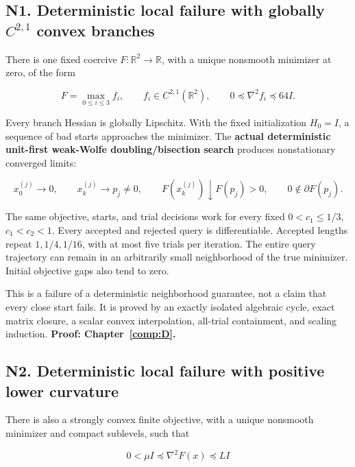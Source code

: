 

\subsection{N1. Deterministic local failure with globally \texorpdfstring{$C^{2,1}$}{C2,1} convex branches}\label{n1.-deterministic-local-failure-with-globally-c21-convex-branches}

There is one fixed coercive \(F:\mathbb R^2\to\mathbb R\), with a unique nonsmooth minimizer at zero, of the form

\[
 F=\max_{0\le i\le3}f_i,\qquad f_i\in C^{2,1}(\mathbb R^2),\qquad
 0\preceq\nabla^2f_i\preceq64I.
\]

Every branch Hessian is globally Lipschitz. With the fixed initialization \(H_0=I\), a sequence of bad starts approaches the minimizer. The \textbf{actual deterministic unit-first weak-Wolfe doubling/bisection search} produces nonstationary converged limits:

\[
 x_0^{(j)}\to0,\qquad x_k^{(j)}\to p_j\ne0,\qquad
 F(x_k^{(j)})\downarrow F(p_j)>0,\qquad0\notin\partial F(p_j).
\]

The same objective, starts, and trial decisions work for every fixed \(0<c_1\le1/3\), \(c_1<c_2<1\). Every accepted and rejected query is differentiable. Accepted lengths repeat \(1,1/4,1/16\), with at most five trials per iteration. The entire query trajectory can remain in an arbitrarily small neighborhood of the true minimizer. Initial objective gaps also tend to zero.

This is a failure of a deterministic neighborhood guarantee, not a claim that every close start fails. It is proved by an exactly isolated algebraic cycle, exact matrix closure, a scalar convex interpolation, all-trial containment, and scaling induction. \textbf{Proof: Chapter~\ref{comp:D}.}



\subsection{N2. Deterministic local failure with positive lower curvature}\label{n2.-deterministic-local-failure-with-positive-lower-curvature}

There is also a strongly convex finite objective, with a unique nonsmooth minimizer and compact sublevels, such that

\[
 0<\mu I\preceq\nabla^2F(x)\preceq LI
\]

